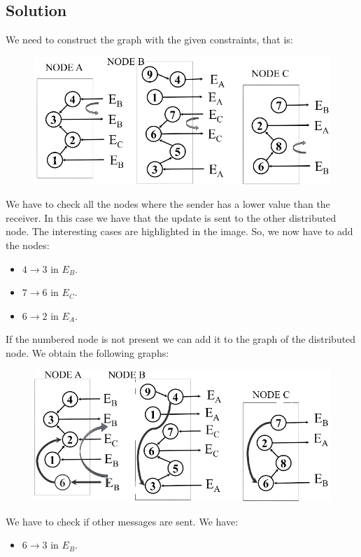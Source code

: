 \documentclass[12pt, a4paper]{report}
\begin{document}
    \subsection*{Solution}
        We need to construct the graph with the given constraints, that is: 
        \begin{figure}[H]
            \centering
            \includegraphics[width=0.75\linewidth]{images/Ob1.png}
        \end{figure}
        We have to check all the nodes where the sender has a lower value than the receiver. In this case we have that the update is sent to the 
        other distributed node. The interesting cases are highlighted in the image. So, we now have to add the nodes: 
        \begin{itemize}
            \item $4 \rightarrow 3$ in $E_B$. 
            \item $7 \rightarrow 6$ in $E_C$. 
            \item $6 \rightarrow 2$ in $E_A$. 
        \end{itemize}
        If the numbered node is not present we can add it to the graph of the distributed node. We obtain the following graphs: 
        \begin{figure}[H]
            \centering
            \includegraphics[width=0.75\linewidth]{images/Ob2.png}
        \end{figure}
        We have to check if other messages are sent. We have:
        \begin{itemize}
            \item $6 \rightarrow 3$ in $E_B$. 
        \end{itemize}
\end{document}
